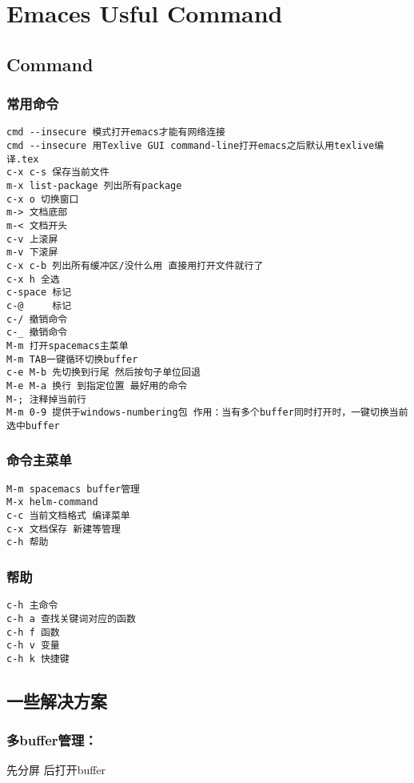 \documentclass[11pt]{article}
\date{\today}
\title{}
\begin{document}
\tableofcontents

\section{Emaces Usful Command}
\label{sec:orgf9dc366}
\subsection{Command}
\label{sec:org66c83a4}
\subsubsection{常用命令}
\label{sec:org7310022}
\begin{verbatim}
cmd --insecure 模式打开emacs才能有网络连接
cmd --insecure 用Texlive GUI command-line打开emacs之后默认用texlive编译.tex
c-x c-s 保存当前文件
m-x list-package 列出所有package
c-x o 切换窗口
m-> 文档底部
m-< 文档开头
c-v 上滚屏
m-v 下滚屏
c-x c-b 列出所有缓冲区/没什么用 直接用打开文件就行了
c-x h 全选
c-space 标记
c-@     标记
c-/ 撤销命令
c-_ 撤销命令
M-m 打开spacemacs主菜单
M-m TAB一键循环切换buffer
c-e M-b 先切换到行尾 然后按句子单位回退
M-e M-a 换行 到指定位置 最好用的命令
M-; 注释掉当前行
M-m 0-9 提供于windows-numbering包 作用：当有多个buffer同时打开时，一键切换当前选中buffer
\end{verbatim}
\subsubsection{命令主菜单}
\label{sec:org46e8a50}
\begin{verbatim}
M-m spacemacs buffer管理
M-x helm-command
c-c 当前文档格式 编译菜单
c-x 文档保存 新建等管理
c-h 帮助
\end{verbatim}
\subsubsection{帮助}
\label{sec:org2d8f419}
\begin{verbatim}
c-h 主命令
c-h a 查找关键词对应的函数
c-h f 函数
c-h v 变量
c-h k 快捷键
\end{verbatim}
\subsection{一些解决方案}
\label{sec:org6497394}
\subsubsection{多buffer管理：}
\label{sec:org41d4c6e}
先分屏 后打开buffer
\end{document}
